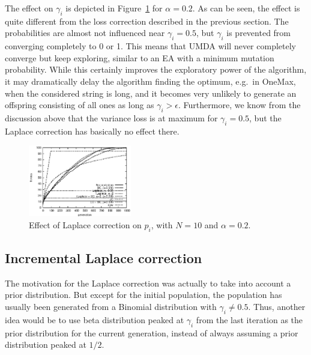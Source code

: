 \documentclass{acm_proc_article-sp}
\newcommand{\Np}{N}
\newcommand{\p}{\gamma}
\begin{document}
The effect on $\p_i$ is depicted in Figure~\ref{fig:laplace} for
$\alpha=0.2$. As can be seen, the effect is quite different from the
loss correction described in the previous section. The probabilities are
almost not influenced near $\p_i=0.5$, but $\p_i$ is prevented from
converging completely to 0 or 1. This means that UMDA will never
completely converge but keep exploring, similar to an EA with a
minimum mutation probability. While this certainly improves the
exploratory power of the algorithm, it may dramatically delay the
algorithm finding the optimum, e.g.\ in OneMax, when the considered
string is long, and it becomes very unlikely to generate an offspring
consisting of all ones as long as $\p_i>\epsilon$.  Furthermore, we
know from the discussion above that the variance loss is at maximum
for $\p_i=0.5$, but the Laplace correction has basically no effect
there.
\begin{figure}
\centerline{
\includegraphics[width=0.4\textwidth]{graph_leading1169910391/graph_leading000_fitness.eps}}
\caption{Effect of Laplace correction on $p_i$, with $\Np=10$ and 
$\alpha=0.2$.\label{fig:laplace}}
\end{figure}




\subsection{Incremental Laplace correction}
\label{sec:iLaplace}

The motivation for the Laplace correction was actually to take into
account a prior distribution. But except for the initial population,
the population has usually been generated from a Binomial distribution
with $\p_i\neq 0.5$. Thus, another idea would be to use beta
distribution peaked at $\p_i$ from the
last iteration as the prior distribution for the current generation, instead
of always assuming a prior distribution peaked at $1/2$.
\end{document}
